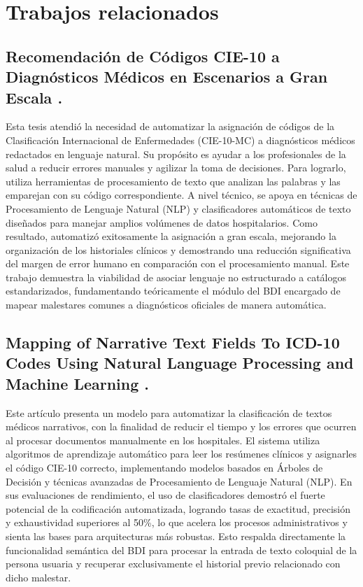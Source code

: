 \section{Trabajos relacionados}

\subsection{Recomendación de Códigos CIE-10 a Diagnósticos Médicos en Escenarios a Gran Escala \cite{Velasco}.}
Esta tesis atendió la necesidad de automatizar la asignación de códigos de la Clasificación Internacional de Enfermedades (CIE-10-MC) a diagnósticos médicos redactados en lenguaje natural. Su propósito es ayudar a los profesionales de la salud a reducir errores manuales y agilizar la toma de decisiones. Para lograrlo, utiliza herramientas de procesamiento de texto que analizan las palabras y las emparejan con su código correspondiente. A nivel técnico, se apoya en técnicas de Procesamiento de Lenguaje Natural (NLP) y clasificadores automáticos de texto diseñados para manejar amplios volúmenes de datos hospitalarios. Como resultado, automatizó exitosamente la asignación a gran escala, mejorando la organización de los historiales clínicos y demostrando una reducción significativa del margen de error humano en comparación con el procesamiento manual. Este trabajo demuestra la viabilidad de asociar lenguaje no estructurado a catálogos estandarizados, fundamentando teóricamente el módulo del BDI encargado de mapear malestares comunes a diagnósticos oficiales de manera automática.

\subsection{Mapping of Narrative Text Fields To ICD-10 Codes Using Natural Language Processing and Machine Learning \cite{nkolele}.}
Este artículo presenta un modelo para automatizar la clasificación de textos médicos narrativos, con la finalidad de reducir el tiempo y los errores que ocurren al procesar documentos manualmente en los hospitales. El sistema utiliza algoritmos de aprendizaje automático para leer los resúmenes clínicos y asignarles el código CIE-10 correcto, implementando modelos basados en Árboles de Decisión y técnicas avanzadas de Procesamiento de Lenguaje Natural (NLP). En sus evaluaciones de rendimiento, el uso de clasificadores demostró el fuerte potencial de la codificación automatizada, logrando tasas de exactitud, precisión y exhaustividad superiores al 50\%, lo que acelera los procesos administrativos y sienta las bases para arquitecturas más robustas. Esto respalda directamente la funcionalidad semántica del BDI para procesar la entrada de texto coloquial de la persona usuaria y recuperar exclusivamente el historial previo relacionado con dicho malestar.


